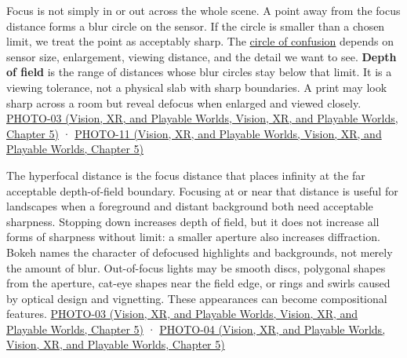 Focus is not simply in or out across the whole scene. A point away from the focus distance forms a blur circle on the sensor. If the circle is smaller than a chosen limit, we treat the point as acceptably sharp. The \hyperref[appendix-21f8456e2629]{circle of confusion} depends on sensor size, enlargement, viewing distance, and the detail we want to see. \textbf{Depth of field} is the range of distances whose blur circles stay below that limit. It is a viewing tolerance, not a physical slab with sharp boundaries. A print may look sharp across a room but reveal defocus when enlarged and viewed closely. \href{../07-Vision-XR-and-Playable-Worlds/main.pdf\#nameddest=04-visual-computing-ii-ch036-photo-03---photography-session-03}{PHOTO-03 (Vision, XR, and Playable Worlds, Vision, XR, and Playable Worlds, Chapter 5)} · \href{../07-Vision-XR-and-Playable-Worlds/main.pdf\#nameddest=04-visual-computing-ii-ch036-photo-11---photography-session-11}{PHOTO-11 (Vision, XR, and Playable Worlds, Vision, XR, and Playable Worlds, Chapter 5)}

The hyperfocal distance is the focus distance that places infinity at the far acceptable depth-of-field boundary. Focusing at or near that distance is useful for landscapes when a foreground and distant background both need acceptable sharpness. Stopping down increases depth of field, but it does not increase all forms of sharpness without limit: a smaller aperture also increases diffraction. Bokeh names the character of defocused highlights and backgrounds, not merely the amount of blur. Out-of-focus lights may be smooth discs, polygonal shapes from the aperture, cat-eye shapes near the field edge, or rings and swirls caused by optical design and vignetting. These appearances can become compositional features. \href{../07-Vision-XR-and-Playable-Worlds/main.pdf\#nameddest=04-visual-computing-ii-ch036-photo-03---photography-session-03}{PHOTO-03 (Vision, XR, and Playable Worlds, Vision, XR, and Playable Worlds, Chapter 5)} · \href{../07-Vision-XR-and-Playable-Worlds/main.pdf\#nameddest=04-visual-computing-ii-ch036-photo-04---photography-session-04}{PHOTO-04 (Vision, XR, and Playable Worlds, Vision, XR, and Playable Worlds, Chapter 5)}


